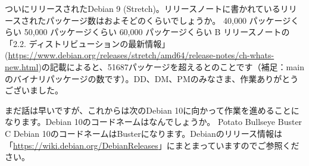%

\santaku
{ついにリリースされたDebian 9 (Stretch)。リリースノートに書かれているリリースされたパッケージ数はおよそどのくらいでしょうか。}
{40,000 パッケージくらい}
{50,000 パッケージくらい}
{60,000 パッケージくらい}
{B}
{リリースノートの「2.2. ディストリビューションの最新情報」(\url{https://www.debian.org/releases/stretch/amd64/release-notes/ch-whats-new.html})の記載によると、51687パッケージを超えるとのことです（補足：mainのバイナリパッケージの数です）。DD、DM、PMのみなさま、作業ありがとうございました。}

\santaku
{まだ話は早いですが、これからは次のDebian 10に向かって作業を進めることになります。Debian 10のコードネームはなんでしょうか。}
{Potato}
{Bullseye}
{Buster}
{C}
{Debian 10のコードネームはBusterになります。Debianのリリース情報は「\url{https://wiki.debian.org/DebianReleases}」にまとまっていますのでご参照ください。}
